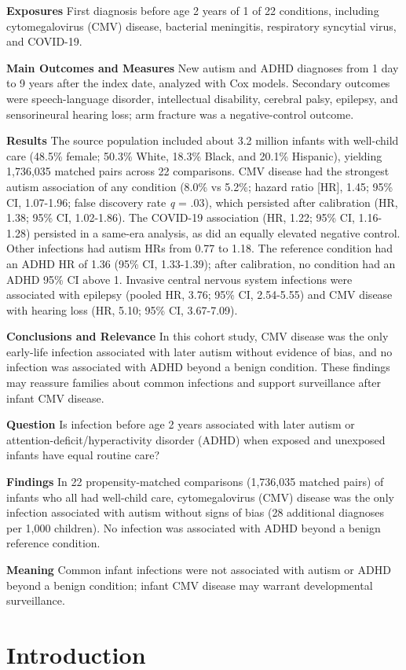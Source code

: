 \documentclass[11pt]{article}
\begin{document}
\textbf{Exposures} First diagnosis before age 2 years of 1 of 22 conditions, including cytomegalovirus (CMV) disease, bacterial meningitis, respiratory syncytial virus, and COVID-19.

\textbf{Main Outcomes and Measures} New autism and ADHD diagnoses from 1 day to 9 years after the index date, analyzed with Cox models. Secondary outcomes were speech-language disorder, intellectual
disability, cerebral palsy, epilepsy, and sensorineural hearing loss; arm fracture was a negative-control outcome.

\textbf{Results} The source population included about 3.2 million infants with well-child care (48.5\% female; 50.3\% White, 18.3\% Black, and 20.1\% Hispanic), yielding 1,736,035 matched pairs across
22 comparisons. CMV disease had the strongest autism association of any condition (8.0\% vs 5.2\%; hazard ratio {[}HR{]}, 1.45; 95\% CI, 1.07-1.96; false discovery rate \emph{q} = .03), which
persisted after calibration (HR, 1.38; 95\% CI, 1.02-1.86). The COVID-19 association (HR, 1.22; 95\% CI, 1.16-1.28) persisted in a same-era analysis, as did an equally elevated negative control. Other
infections had autism HRs from 0.77 to 1.18. The reference condition had an ADHD HR of 1.36 (95\% CI, 1.33-1.39); after calibration, no condition had an ADHD 95\% CI above 1. Invasive central nervous
system infections were associated with epilepsy (pooled HR, 3.76; 95\% CI, 2.54-5.55) and CMV disease with hearing loss (HR, 5.10; 95\% CI, 3.67-7.09).

\textbf{Conclusions and Relevance} In this cohort study, CMV disease was the only early-life infection associated with later autism without evidence of bias, and no infection was associated with ADHD
beyond a benign condition. These findings may reassure families about common infections and support surveillance after infant CMV disease.

\newpage
\begin{tcolorbox}[enhanced,colback=white,colframe=black,boxrule=0.6pt,arc=0pt,left=8pt,right=8pt,top=6pt,bottom=6pt,title={\textbf{Key Points}},coltitle=black,colbacktitle=white,attach title to upper,after title={\par\smallskip}]
\textbf{Question} Is infection before age 2 years associated with later autism or attention-deficit/hyperactivity disorder (ADHD) when exposed and unexposed infants have equal routine care?

\textbf{Findings} In 22 propensity-matched comparisons (1,736,035 matched pairs) of infants who all had well-child care, cytomegalovirus (CMV) disease was the only infection associated with autism
without signs of bias (28 additional diagnoses per 1,000 children). No infection was associated with ADHD beyond a benign reference condition.

\textbf{Meaning} Common infant infections were not associated with autism or ADHD beyond a benign condition; infant CMV disease may warrant developmental surveillance.
\end{tcolorbox}
\newpage
\hypertarget{introduction}{%
\section*{Introduction}\label{introduction}}
\end{document}
